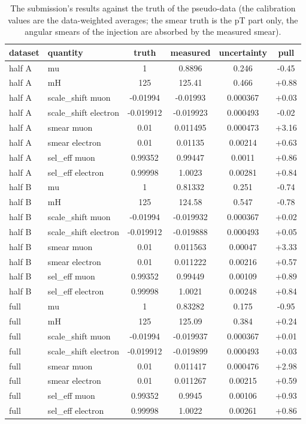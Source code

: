 \documentclass[11pt,a4paper]{article}
\begin{document}
\begin{table}[H]\centering\small\begin{tabular}{llcccc}\toprule dataset & quantity & truth & measured & uncertainty & pull\\\midrule
half A & mu & 1 & 0.8896 & 0.246 & -0.45\\
half A & mH & 125 & 125.41 & 0.466 & +0.88\\
half A & scale\_shift muon & -0.01994 & -0.01993 & 0.000367 & +0.03\\
half A & scale\_shift electron & -0.019912 & -0.019923 & 0.000493 & -0.02\\
half A & smear muon & 0.01 & 0.011495 & 0.000473 & +3.16\\
half A & smear electron & 0.01 & 0.01135 & 0.00214 & +0.63\\
half A & sel\_eff muon & 0.99352 & 0.99447 & 0.0011 & +0.86\\
half A & sel\_eff electron & 0.99998 & 1.0023 & 0.00281 & +0.84\\
half B & mu & 1 & 0.81332 & 0.251 & -0.74\\
half B & mH & 125 & 124.58 & 0.547 & -0.78\\
half B & scale\_shift muon & -0.01994 & -0.019932 & 0.000367 & +0.02\\
half B & scale\_shift electron & -0.019912 & -0.019888 & 0.000493 & +0.05\\
half B & smear muon & 0.01 & 0.011563 & 0.00047 & +3.33\\
half B & smear electron & 0.01 & 0.011222 & 0.00216 & +0.57\\
half B & sel\_eff muon & 0.99352 & 0.99449 & 0.00109 & +0.89\\
half B & sel\_eff electron & 0.99998 & 1.0021 & 0.00248 & +0.84\\
full & mu & 1 & 0.83282 & 0.175 & -0.95\\
full & mH & 125 & 125.09 & 0.384 & +0.24\\
full & scale\_shift muon & -0.01994 & -0.019937 & 0.000367 & +0.01\\
full & scale\_shift electron & -0.019912 & -0.019899 & 0.000493 & +0.03\\
full & smear muon & 0.01 & 0.011417 & 0.000476 & +2.98\\
full & smear electron & 0.01 & 0.011267 & 0.00215 & +0.59\\
full & sel\_eff muon & 0.99352 & 0.9945 & 0.00106 & +0.93\\
full & sel\_eff electron & 0.99998 & 1.0022 & 0.00261 & +0.86\\
\bottomrule\end{tabular}\caption{The submission's results against the truth of the pseudo-data (the calibration values are the data-weighted averages; the smear truth is the pT part only, the angular smears of the injection are absorbed by the measured smear).}\end{table}
\appendix
\end{document}
